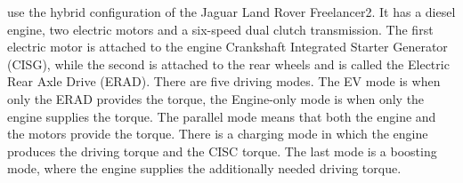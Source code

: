 
\citet{dextreit2014game} use the hybrid configuration of the Jaguar Land Rover Freelancer2. It has a diesel engine, two electric motors and a six-speed dual clutch transmission. The first electric motor is attached to the engine Crankshaft Integrated Starter Generator (CISG), while the second is attached to the rear wheels and is called the Electric Rear Axle Drive (ERAD). There are five driving modes. The EV mode is when only the ERAD provides the torque, the Engine-only mode is when only the engine supplies the torque. The parallel mode means that both the engine and the motors provide the torque. There is a charging mode in which the engine produces the driving torque and the CISC torque. The last mode is a boosting mode, where the engine supplies the additionally needed driving torque.

